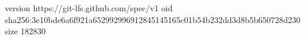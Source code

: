 version https://git-lfs.github.com/spec/v1
oid sha256:3e10bde6a6f921a652992996912845145165c01b54b232dd3d8b5b650728d230
size 182830
